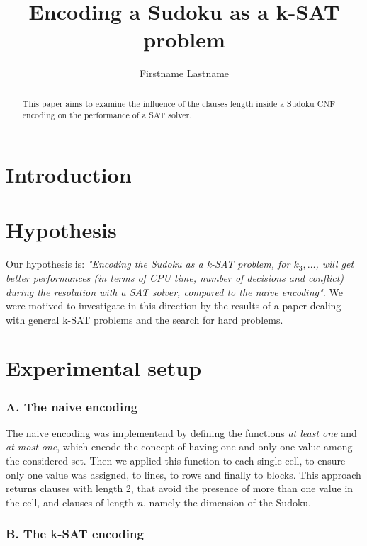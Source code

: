 \documentclass[journal, a4paper]{IEEEtran}
\begin{document}
	\title{Encoding a Sudoku as a k-SAT problem}
	\author{Firstname Lastname}
	\maketitle

\begin{abstract}
	This paper aims to examine the influence of the clauses length inside a Sudoku CNF encoding on the performance of a SAT solver.
\end{abstract}


\section{Introduction}
	


\section{Hypothesis}
	Our hypothesis is: \textit{"Encoding the Sudoku as a k-SAT problem, for $k _ 3, \dots$, will get better performances (in terms of CPU time, number of decisions and conflict) during the resolution with a SAT solver, compared to the naive encoding".} We were motived to investigate in this direction by the results of a paper dealing with general k-SAT problems and the search for hard problems.

\section{Experimental setup}
	
\subsubsection*{A. The naive encoding}
	
	The naive encoding was implementend by defining the functions \textit{at least one} and \textit{at most one}, which encode the concept of having one and only one value among the considered set. Then we applied this function to each single cell, to ensure only one value was assigned, to lines, to rows and finally to blocks. This approach returns clauses with length 2, that avoid the presence of more than one value in the cell, and clauses of length $n$, namely the dimension of the Sudoku. 
	
\subsubsection*{B. The k-SAT encoding}
	
\end{document}
